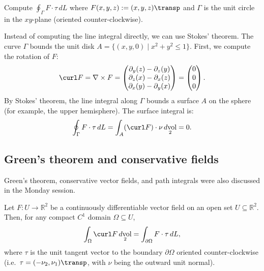 \begin{example}
\label{ex:stokes_path_integral}
Compute $\oint_\Gamma F \cdot \tau \,dL$ where $F(x,y,z) := (x, y, z)\transp$ and $\Gamma$ is the unit circle in the $xy$-plane (oriented counter-clockwise).

Instead of computing the line integral directly, we can use Stokes' theorem. The curve $\Gamma$ bounds the unit disk $A = \{(x,y,0) \mid x^2+y^2 \leq 1\}$.
First, we compute the rotation of $F$:
\[\curl F = \nabla \times F = \begin{pmatrix} \partial_y(z) - \partial_z(y) \\ \partial_z(x) - \partial_x(z) \\ \partial_x(y) - \partial_y(x) \end{pmatrix} = \begin{pmatrix} 0 \\ 0 \\ 0 \end{pmatrix}.\]
By Stokes' theorem, the line integral along $\Gamma$ bounds a surface $A$ on the sphere (for example, the upper hemisphere). The surface integral is:
\[\oint_\Gamma F \cdot \tau \,dL = \int_A (\curl F) \cdot \nu \mathop{d\text{vol}}_2 = 0.\]
\end{example}

\subsection{Green's theorem and conservative fields}
\label{sec:greens_theorem_conservative_fields}

\begin{ainote}
Green's theorem, conservative vector fields, and path integrals were also discussed in the Monday session. 
\end{ainote}

\begin{theorem}
\label{thm:greens_theorem}
Let $F : U \to \mathbb{R}^2$ be a continuously differentiable vector field on an open set $U \subseteq \mathbb{R}^2$. Then, for any compact $C^1$ domain $\Omega \subseteq U$,
\[\int_\Omega \curl F \mathop{d\text{vol}}_2 = \int_{\partial\Omega} F \cdot \tau \,dL,\]
where $\tau$ is the unit tangent vector to the boundary $\partial\Omega$ oriented counter-clockwise (i.e.\ $\tau = (-\nu_2, \nu_1)\transp$, with $\nu$ being the outward unit normal).
\end{theorem}


